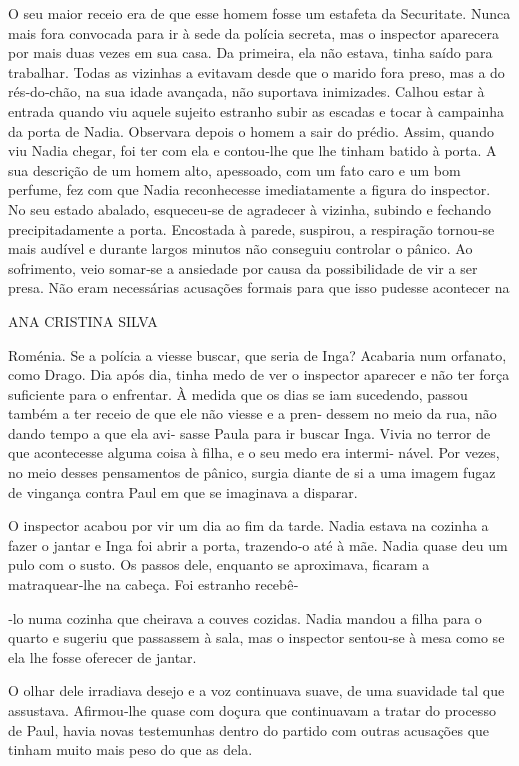 O seu maior receio era de que esse homem fosse um estafeta da
Securitate. Nunca mais fora convocada para ir à sede da polícia secreta,
mas o inspector aparecera por mais duas vezes em sua casa. Da primeira,
ela não estava, tinha saído para trabalhar. Todas as vizinhas a evitavam
desde que o marido fora preso, mas a do rés‑do‑chão, na sua idade
avançada, não suportava inimizades. Calhou estar à entrada quando viu
aquele sujeito estranho subir as escadas e tocar à campainha da porta de
Nadia. Observara depois o homem a sair do prédio. Assim, quando viu
Nadia chegar, foi ter com ela e contou‑lhe que lhe tinham batido à
porta. A sua descrição de um homem alto, apessoado, com um fato caro e
um bom perfume, fez com que Nadia reconhecesse imediatamente a figura do
inspector. No seu estado abalado, esqueceu‑se de agradecer à vizinha,
subindo e fechando precipitadamente a porta. Encostada à parede,
suspirou, a respiração tornou‑se mais audível e durante largos minutos
não conseguiu controlar o pânico. Ao sofrimento, veio somar‑se a
ansiedade por causa da possibilidade de vir a ser presa. Não eram
necessárias acusações formais para que isso pudesse acontecer na

ANA CRISTINA SILVA

Roménia. Se a polícia a viesse buscar, que seria de Inga? Acabaria num
orfanato, como Drago. Dia após dia, tinha medo de ver o inspector
aparecer e não ter força suficiente para o enfrentar. À medida que os
dias se iam sucedendo, passou também a ter receio de que ele não viesse
e a pren‑ dessem no meio da rua, não dando tempo a que ela avi‑ sasse
Paula para ir buscar Inga. Vivia no terror de que acontecesse alguma
coisa à filha, e o seu medo era intermi‑ nável. Por vezes, no meio
desses pensamentos de pânico, surgia diante de si a uma imagem fugaz de
vingança contra Paul em que se imaginava a disparar.

O inspector acabou por vir um dia ao fim da tarde. Nadia estava na
cozinha a fazer o jantar e Inga foi abrir a porta, trazendo‑o até à mãe.
Nadia quase deu um pulo com o susto. Os passos dele, enquanto se
aproximava, ficaram a matraquear‑lhe na cabeça. Foi estranho recebê‑

‑lo numa cozinha que cheirava a couves cozidas. Nadia mandou a filha
para o quarto e sugeriu que passassem à sala, mas o inspector sentou‑se
à mesa como se ela lhe fosse oferecer de jantar.

O olhar dele irradiava desejo e a voz continuava suave, de uma suavidade
tal que assustava. Afirmou‑lhe quase com doçura que continuavam a tratar
do processo de Paul, havia novas testemunhas dentro do partido com
outras acusações que tinham muito mais peso do que as dela.

